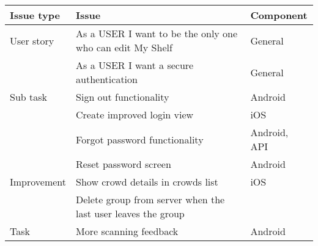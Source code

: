 \begin{longtable}{|L{2cm}|L{10cm}|L{3cm}|}
\hline
\textbf{Issue type} & \textbf{Issue} & \textbf{Component} \\
\hline
User story & As a USER I want to be the only one who can edit My Shelf & General \\
\hline
 & As a USER I want a secure authentication & General \\
 \hline
 
Sub task & Sign out functionality & Android\\
\hline
 & Create improved login view & iOS \\
 \hline
 & Forgot password functionality & Android, API\\
 \hline
 & Reset password screen & Android\\
 \hline

Improvement & Show crowd details in crowds list & iOS\\
\hline
 & Delete group from server when the last user leaves the group & \\
\hline

Task & More scanning feedback & Android \\
 \hline
\end{longtable}
